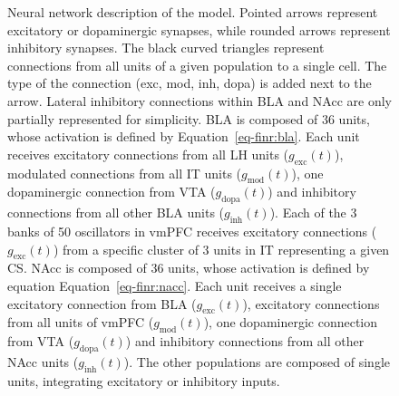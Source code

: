 \documentclass[
  11pt,
  a4paper,
]{scrbook}
\begin{document}
\begin{figure}


\caption{\label{fig-finr:model-detailed}Neural network description of
the model. Pointed arrows represent excitatory or dopaminergic synapses,
while rounded arrows represent inhibitory synapses. The black curved
triangles represent connections from all units of a given population to
a single cell. The type of the connection (exc, mod, inh, dopa) is added
next to the arrow. Lateral inhibitory connections within BLA and NAcc
are only partially represented for simplicity. BLA is composed of 36
units, whose activation is defined by Equation~\ref{eq-finr:bla}. Each
unit receives excitatory connections from all LH units
(\(g_{\text{exc}}(t)\)), modulated connections from all IT units
(\(g_{\text{mod}}(t)\)), one dopaminergic connection from VTA
(\(g_{\text{dopa}}(t)\)) and inhibitory connections from all other BLA
units (\(g_{\text{inh}}(t)\)). Each of the 3 banks of 50 oscillators in
vmPFC receives excitatory connections (\(g_{\text{exc}}(t)\)) from a
specific cluster of 3 units in IT representing a given CS. NAcc is
composed of 36 units, whose activation is defined by equation
Equation~\ref{eq-finr:nacc}. Each unit receives a single excitatory
connection from BLA (\(g_{\text{exc}}(t)\)), excitatory connections from
all units of vmPFC (\(g_{\text{mod}}(t)\)), one dopaminergic connection
from VTA (\(g_{\text{dopa}}(t)\)) and inhibitory connections from all
other NAcc units (\(g_{\text{inh}}(t)\)). The other populations are
composed of single units, integrating excitatory or inhibitory inputs.}

\end{figure}%
\end{document}
